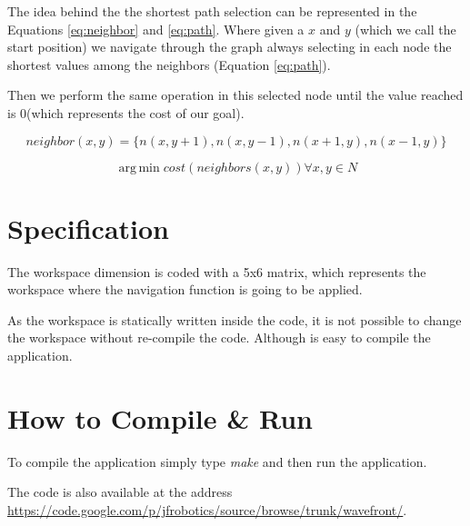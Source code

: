 \documentclass{article}
\begin{document}
The idea behind the the shortest path selection can be represented in the Equations \ref{eq:neighbor} and \ref{eq:path}. Where given a $x$ and $y$ (which we call the start position) we navigate through the graph always selecting in each node the shortest values among the neighbors (Equation \ref{eq:path}).

Then we perform the same operation in this selected node until the value reached is 0(which represents the cost of our goal).
 
\begin{equation}
 neighbor(x,y)=\{n(x,y+1),n(x,y-1),n(x+1,y),n(x-1,y)\}
\label{eq:neighbor}
\end{equation}

\begin{equation}
 \operatorname{arg\,min}cost(neighbors(x,y)) \forall x,y \in N
\label{eq:path}
\end{equation}


\section{Specification}

The workspace dimension is coded with a 5x6 matrix, which represents the workspace where the navigation function is going to be applied. 

As the workspace is statically written inside the code, it is not possible to change the workspace without re-compile the code. Although is easy to compile the application.

\section{How to Compile \& Run}

To compile the application simply type {\it make} and then run the application.

The code is also available at the address \url{https://code.google.com/p/jfrobotics/source/browse/trunk/wavefront/}.
\end{document}
